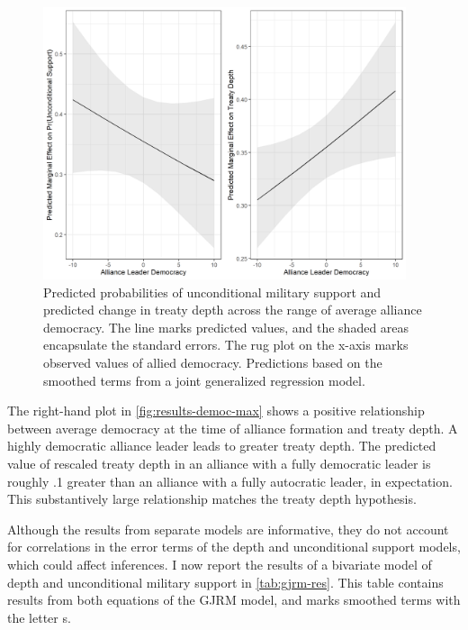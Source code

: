 \documentclass[12pt]{article}
\begin{document}
\begin{figure}[hbtp]
\centering
\includegraphics[width=0.95\textwidth]{../figures/results-democ-max.png}
\caption{Predicted probabilities of unconditional military support and predicted change in treaty depth across the range of average alliance democracy. The line marks predicted values, and the shaded areas encapsulate the standard errors. The rug plot on the x-axis marks observed values of allied democracy. Predictions based on the smoothed terms from a joint generalized regression model.}
\label{fig:results-democ-max}
\end{figure}


The right-hand plot in \autoref{fig:results-democ-max} shows a positive relationship between average democracy at the time of alliance formation and treaty depth.
A highly democratic alliance leader leads to greater treaty depth. 
The predicted value of rescaled treaty depth in an alliance with a fully democratic leader is roughly .1 greater than an alliance with a fully autocratic leader, in expectation. 
This substantively large relationship matches the treaty depth hypothesis.


Although the results from separate models are informative, they do not account for correlations in the error terms of the depth and unconditional support models, which could affect inferences. 
I now report the results of a bivariate model of depth and unconditional military support in \autoref{tab:gjrm-res}. 
This table contains results from both equations of the GJRM model, and marks smoothed terms with the letter s. 
\end{document}
